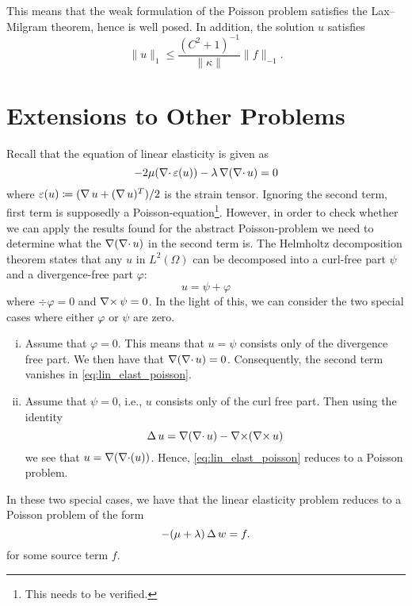 This means that the weak formulation of the Poisson problem satisfies the
Lax--Milgram theorem, hence is well posed. In addition, the solution \( u \) satisfies
\begin{equation}
    \| u \|_1 \leq \frac{(C^2 + 1)^{-1}}{\|\kappa\|}\| f \|_{-1}.
\end{equation}

\section{Extensions to Other Problems}
\label{sec:extensions_to_other_problems}

Recall that the equation of linear elasticity is given as
\begin{equation}
    \label{eq:lin_elast_poisson}
    - 2 \mu ( \operatorname{\mathop{}\!\nabla \cdot} \varepsilon(u)) - \lambda \operatorname{\mathop{}\!\nabla}(\operatorname{\mathop{}\!\nabla \cdot} u) = 0
\end{equation}
where \(\varepsilon(u) \coloneqq (\operatorname{\mathop{}\!\nabla} u + (\operatorname{\mathop{}\!\nabla} u)^T) / 2 \) is the strain
tensor. Ignoring the second term, first term is supposedly a
Poisson-equation\footnote{This needs to be verified.}.  However, in order to
check whether we can apply the results found for the abstract Poisson-problem
we need to determine what the \( \operatorname{\mathop{}\!\nabla} (\operatorname{\mathop{}\!\nabla \cdot} u) \) in the second term is. The
Helmholtz decomposition theorem states that any \( u \) in \( L^2(\Omega) \)
can be decomposed into a curl-free part \( \psi \)  and a divergence-free part
\( \varphi \):
\begin{equation}
    u = \psi + \varphi 
\end{equation}
where \(\div \varphi = 0\) and \(  \operatorname{\mathop{}\!\nabla \times} \psi = 0 \).  In the light of this, we
can consider the two special cases where either \( \varphi \) or \( \psi \) are
zero. 
\begin{enumerate}[(i)]
    \item Assume that \( \varphi = 0 \). This means that \( u = \psi \)
        consists only of the divergence free part. We then have that
        \(\operatorname{\mathop{}\!\nabla}(\operatorname{\mathop{}\!\nabla \cdot} u) = 0 \). Consequently, the second term vanishes in
        \cref{eq:lin_elast_poisson}.
    \item Assume that \( \psi = 0 \), i.e., \( u \) consists only of the curl
        free part. Then using the identity
        \begin{equation}
            \operatorname{\mathop{}\!\Delta} u = \operatorname{\mathop{}\!\nabla}(\operatorname{\mathop{}\!\nabla \cdot} u) - \operatorname{\mathop{}\!\nabla \times}(\operatorname{\mathop{}\!\nabla \times} u)
        \end{equation}
        we see that \( u = \operatorname{\mathop{}\!\nabla}(\operatorname{\mathop{}\!\nabla \cdot}(u)) \). Hence,
        \cref{eq:lin_elast_poisson} reduces to a Poisson problem.
\end{enumerate}
In these two special cases, we have that the linear elasticity problem reduces
to a Poisson problem of the form
\begin{equation}
    -(\mu + \lambda)\operatorname{\mathop{}\!\Delta} w = f.
\end{equation}
for some source term \( f \).

